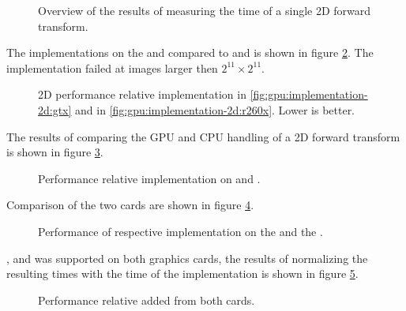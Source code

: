 \begin{figure}[!htbp]
	\centering
	\subfloat[\NVCARD]{	
		
	}
	\vfill
	\subfloat[\AMDCARD]{
		
	}
	\caption{Overview of the results of measuring the time of a single 2D forward transform.}
	\label{fig:gpu:overview-2d}
\end{figure}

The implementations on the {\NVCARD} and {\AMDCARD} compared to {\CU} and {\OCL} is shown in figure \ref{fig:gpu:implementation-2d}. The {\GL} implementation failed at images larger then $2^{11}{\times}2^{11}$.

\begin{figure}[!htbp]
	\centering
	\subfloat[\NVCARD\label{fig:gpu:implementation-2d:gtx}]{	
		
	}
	\vfill
	\subfloat[\AMDCARD\label{fig:gpu:implementation-2d:r260x}]{
		
	}	
	\caption{2D performance relative {\CU} implementation in \ref{fig:gpu:implementation-2d:gtx} and {\OCL} in \ref{fig:gpu:implementation-2d:r260x}. Lower is better.}
	\label{fig:gpu:implementation-2d}
\end{figure}

The results of comparing the GPU and CPU handling of a 2D forward transform is shown in figure \ref{fig:gtx:cpu-2d}.

\begin{figure}[!htbp]
	\centering
	
	\caption{Performance relative {\CU} implementation on {\NVCARD} and {\INTELCPU}.}
	\label{fig:gtx:cpu-2d}
\end{figure}

Comparison of the two cards are shown in figure \ref{fig:gpu-comparison-2d}.

\begin{figure}[!htbp]
	\centering
	
	\caption{Performance of respective implementation on the {\AMDCARD} and the {\NVCARD}.}
	\label{fig:gpu-comparison-2d}
\end{figure}

{\DX}, {\GL} and {\OCL} was supported on both graphics cards, the results of normalizing the resulting times with the time of the {\OCL} implementation is shown in figure \ref{fig:gpu-comparison-tech-2d}.

\begin{figure}[!htbp]
	\centering
	
	\caption{Performance relative {\OCL} added from both cards.}
	\label{fig:gpu-comparison-tech-2d}
\end{figure}

